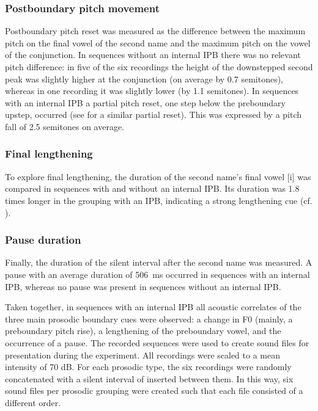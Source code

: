 \documentclass[output=paper]{langscibook}
\begin{document}
\subsubsection{Postboundary pitch movement} 
Postboundary pitch reset was measured as the difference between the maximum pitch on the final vowel of the second name and the maximum pitch on the vowel of the conjunction. In sequences without an internal IPB there was no relevant pitch difference: in five of the six recordings the height of the downstepped second peak was slightly higher at the conjunction (on average by 0.7 semitones), whereas in one recording it was slightly lower (by 1.1 semitones). In sequences with an internal IPB a partial pitch reset, one step below the preboundary upstep, occurred (see \citealt{Truckenbrodt2007b} for a similar partial reset). This was expressed by a pitch fall of 2.5 semitones on average.

\subsubsection{Final lengthening} 
To explore final lengthening, the duration of the second name’s final vowel [i] was compared in sequences with and without an internal IPB. Its duration was 1.8 times longer in the grouping with an IPB, indicating a strong lengthening cue (cf. \citealt{Kohler1983}).

\subsubsection{Pause duration} 
Finally, the duration of the silent interval after the second name was measured. A pause with an average duration of \qty{506}{\ms} occurred in sequences with an internal IPB, whereas no pause was present in sequences without an internal IPB.


Taken together, in sequences with an internal IPB all acoustic correlates of the three main prosodic boundary cues were observed: a change in F0 (mainly, a preboundary pitch rise), a lengthening of the preboundary vowel, and the occurrence of a pause.
The recorded sequences were used to create sound files for presentation during the experiment. All recordings were scaled to a mean intensity of 70 dB. For each prosodic type, the six recordings were randomly concatenated with a silent interval of  inserted between them. In this way, six sound files per prosodic grouping were created such that each file consisted of a different order.
\end{document}
